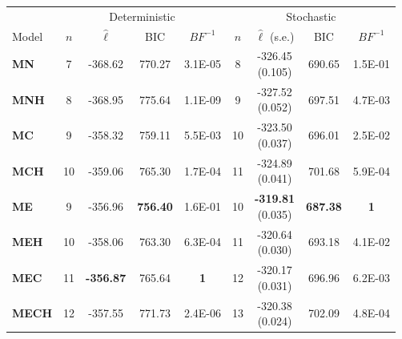 \begin{table}[h!]
\centering
\small
\begin{tabular}{lcccccccc}
  \toprule
  & \multicolumn{4}{c}{Deterministic} & \multicolumn{4}{c}{Stochastic} \\
    \cmidrule(rl){2-5}\cmidrule(rl){6-9}
  Model & $n$ & $\hat{\ell}$ & BIC & ${BF}^{-1}$ & $n$ & \makecell{$\hat{\ell}$ \vspace{-.1cm} \\ \scriptsize{(s.e.)}}  & BIC  & $BF^{-1}$ \\ 
  \cmidrule(rl){2-5}\cmidrule(rl){6-9}
  \textbf{MN} &   7 & -368.62 & 770.27 & 3.1E-05 &   8 & \makecell{-326.45 \vspace{-.1cm} \\ \scriptsize{(0.105)}} & 690.65 & 1.5E-01 \\ 
   \textbf{MNH} &   8 & -368.95 & 775.64 & 1.1E-09 &   9 & \makecell{-327.52\vspace{-.1cm} \\ \scriptsize{(0.052)}} & 697.51 & 4.7E-03 \\ 
   \textbf{MC} &   9 & -358.32 & 759.11 & 5.5E-03 &  10 & \makecell{-323.50\vspace{-.1cm} \\ \scriptsize{(0.037)}} & 696.01 & 2.5E-02 \\ 
   \textbf{MCH} &  10 & -359.06 & 765.30 & 1.7E-04 &  11 & \makecell{-324.89\vspace{-.1cm} \\ \scriptsize{(0.041)}} & 701.68 & 5.9E-04 \\ 
   \textbf{ME} &   9 & -356.96 & \textbf{756.40} & 1.6E-01 &  10 & \makecell{\textbf{-319.81}\vspace{-.1cm} \\ \scriptsize{(0.035)}} & \textbf{687.38} & \textbf{1} \\ 
   \textbf{MEH} &  10 & -358.06 & 763.30 & 6.3E-04 &  11 & \makecell{-320.64\vspace{-.1cm} \\ \scriptsize{(0.030)}} & 693.18 & 4.1E-02 \\ 
   \textbf{MEC} &  11 & \textbf{-356.87} & 765.64 & \textbf{1} &  12 & \makecell{-320.17\vspace{-.1cm} \\ \scriptsize{(0.031)}} & 696.96 & 6.2E-03 \\ 
   \textbf{MECH} &  12 & -357.55 & 771.73 & 2.4E-06 &  13 & \makecell{-320.38\vspace{-.1cm} \\ \scriptsize{(0.024)}} & 702.09 & 4.8E-04 \\ 

\end{tabular}
\end{table}
